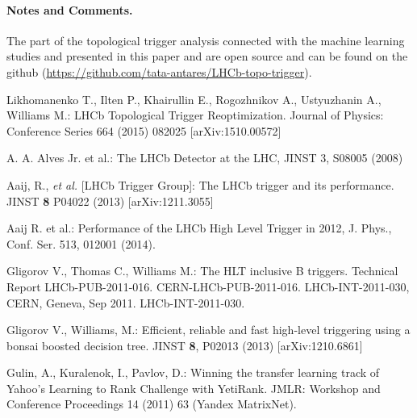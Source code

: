 \documentclass{llncs}
\begin{document}
\paragraph{Notes and Comments.}
The part of the topological trigger analysis connected with the machine learning studies and presented in this paper and \cite{run2_topo} are open source and can be found on the github (\url{https://github.com/tata-antares/LHCb-topo-trigger}).
%
%
\begin{thebibliography}{5}
%
 Likhomanenko T., Ilten P., Khairullin E., Rogozhnikov A., Ustyuzhanin A., Williams M.: 
LHCb Topological Trigger Reoptimization. Journal of Physics: Conference Series 664 (2015) 082025 [arXiv:1510.00572]

  A. A. Alves Jr. et al.: The LHCb Detector at the LHC, JINST 3, S08005 (2008)

 Aaij, R., {\em et al.} [LHCb Trigger Group]: 
The LHCb trigger and its performance.
JINST {\bf 8} P04022 (2013) [arXiv:1211.3055]

 Aaij R. et al.: 
Performance of the LHCb High Level Trigger in 2012, J. Phys., Conf. Ser. 513, 012001 (2014).

 Gligorov V., Thomas C., Williams M.: 
The HLT inclusive B triggers. Technical Report
LHCb-PUB-2011-016. CERN-LHCb-PUB-2011-016. LHCb-INT-2011-030, CERN, Geneva, Sep 2011. LHCb-INT-2011-030.

 Gligorov V., Williams, M.:
Efficient, reliable and fast high-level triggering using a bonsai boosted decision tree.
JINST {\bf 8}, P02013 (2013) [arXiv:1210.6861]

 Gulin, A., Kuralenok, I., Pavlov, D.:
Winning the transfer learning track of Yahoo's Learning to Rank Challenge with YetiRank.
JMLR: Workshop and Conference Proceedings 14 (2011) 63 (Yandex MatrixNet).






\end{thebibliography}
\end{document}
